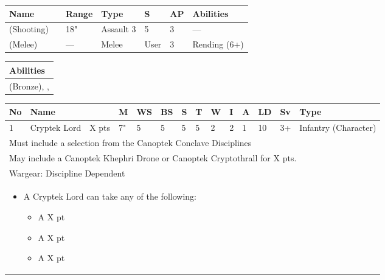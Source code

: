 \noindent
\begin{tabular}{||m{110pt} m{30pt} m{31pt} m{55pt} m{12pt} m{12pt} m{210pt}||}
	\hline
	Name & & Range & Type & S & AP & Abilities \\
	\hline
	\quickref{Staff of Light} (Shooting) & & 18" & Assault 3 & 5 & 3 & — \\
	\quickref{Staff of Light} (Melee) & & — & Melee & User & 3 & Rending (6+) \\
	\hline
\end{tabular}

\noindent
\begin{tabular}{||m{532pt}||}
	\hline
	Abilities \\
	\hline
	\quickref{Awakening Protocols}(Bronze), \quickref{Living Metal}, \quickref{Reanimation Protocols} \\
	\hline
\end{tabular}



\newpage
{}

\noindent
\begin{tabular}{||m{10pt} m{95pt} m{30pt} m{11pt} m{11pt} m{11pt} m{11pt} m{11pt} m{11pt} m{11pt} m{11pt} m{11pt} m{11pt} m{125pt}||}
	\hline
	No & Name & & M & WS & BS & S & T & W & I & A & LD & Sv & Type \\
	\hline
	1 & Cryptek Lord & X pts & 7" & 5 & 5 & 5 & 5 & 2 & 2 & 1 & 10 & 3+ & Infantry (Character)\\
	\hline
	\hline
	\multicolumn{14}{||Z{532 pt}||}{Must include a selection from the Canoptek Conclave Disciplines}\\
	\multicolumn{14}{||Z{532 pt}||}{May include a Canoptek Khephri Drone or Canoptek Cryptothrall for X pts.}\\	
	\hline
	\hline
	\multicolumn{14}{||Z{532 pt}||}{Wargear: Discipline Dependent} \\		
	\multicolumn{14}{||Z{532 pt}||}{\begin{itemize}
			\item A Cryptek Lord can take any of the following:
			\begin{itemize}
				\item A \quickref{Phase Shifter} \hrulefill X pt
				\item A \quickref{Phylactery} \hrulefill X pt
				\item A \quickref{Sempiternal Weave} \hrulefill X pt
			\end{itemize}
	\end{itemize}} \\	
	\hline
\end{tabular}

